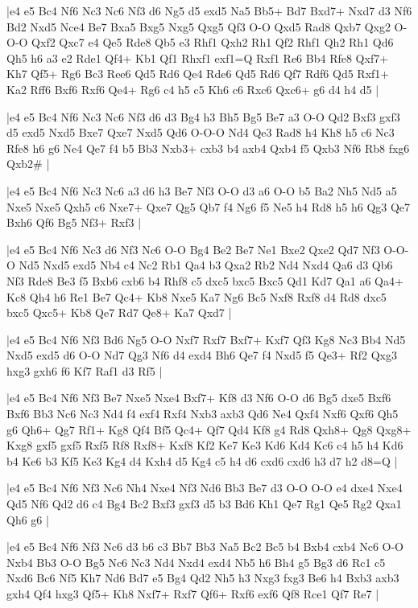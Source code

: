 \whitename{}
\blackname{}
\makegametitle
|e4 e5 Bc4 Nf6 Nc3 Nc6 Nf3 d6 Ng5 d5 exd5 Na5 Bb5+ Bd7 Bxd7+ Nxd7 d3 Nf6 Bd2 Nxd5 Nce4 Be7 Bxa5 Bxg5 Nxg5 Qxg5 Qf3 O-O Qxd5 Rad8 Qxb7 Qxg2 O-O-O Qxf2 Qxc7 e4 Qe5 Rde8 Qb5 e3 Rhf1 Qxh2 Rh1 Qf2 Rhf1 Qh2 Rh1 Qd6 Qh5 h6 a3 e2 Rde1 Qf4+ Kb1 Qf1 Rhxf1 exf1=Q Rxf1 Re6 Bb4 Rfe8 Qxf7+ Kh7 Qf5+ Rg6 Bc3 Ree6 Qd5 Rd6 Qe4 Rde6 Qd5 Rd6 Qf7 Rdf6 Qd5 Rxf1+ Ka2 Rff6 Bxf6 Rxf6 Qe4+ Rg6 c4 h5 c5 Kh6 c6 Rxc6 Qxc6+ g6 d4 h4 d5  |

\whitename{}
\blackname{}
\makegametitle
|e4 e5 Bc4 Nf6 Nc3 Nc6 Nf3 d6 d3 Bg4 h3 Bh5 Bg5 Be7 a3 O-O Qd2 Bxf3 gxf3 d5 exd5 Nxd5 Bxe7 Qxe7 Nxd5 Qd6 O-O-O Nd4 Qe3 Rad8 h4 Kh8 h5 c6 Nc3 Rfe8 h6 g6 Ne4 Qe7 f4 b5 Bb3 Nxb3+ cxb3 b4 axb4 Qxb4 f5 Qxb3 Nf6 Rb8 fxg6 Qxb2\#  |

\whitename{}
\blackname{}
\makegametitle
|e4 e5 Bc4 Nf6 Nc3 Nc6 a3 d6 h3 Be7 Nf3 O-O d3 a6 O-O b5 Ba2 Nh5 Nd5 a5 Nxe5 Nxe5 Qxh5 c6 Nxe7+ Qxe7 Qg5 Qb7 f4 Ng6 f5 Ne5 h4 Rd8 h5 h6 Qg3 Qe7 Bxh6 Qf6 Bg5 Nf3+ Rxf3  |

\whitename{}
\blackname{}
\makegametitle
|e4 e5 Bc4 Nf6 Nc3 d6 Nf3 Nc6 O-O Bg4 Be2 Be7 Ne1 Bxe2 Qxe2 Qd7 Nf3 O-O-O Nd5 Nxd5 exd5 Nb4 c4 Nc2 Rb1 Qa4 b3 Qxa2 Rb2 Nd4 Nxd4 Qa6 d3 Qb6 Nf3 Rde8 Be3 f5 Bxb6 cxb6 b4 Rhf8 c5 dxc5 bxc5 Bxc5 Qd1 Kd7 Qa1 a6 Qa4+ Kc8 Qh4 h6 Re1 Be7 Qc4+ Kb8 Nxe5 Ka7 Ng6 Bc5 Nxf8 Rxf8 d4 Rd8 dxc5 bxc5 Qxc5+ Kb8 Qe7 Rd7 Qe8+ Ka7 Qxd7  |

\whitename{}
\blackname{}
\makegametitle
|e4 e5 Bc4 Nf6 Nf3 Bd6 Ng5 O-O Nxf7 Rxf7 Bxf7+ Kxf7 Qf3 Kg8 Nc3 Bb4 Nd5 Nxd5 exd5 d6 O-O Nd7 Qg3 Nf6 d4 exd4 Bh6 Qe7 f4 Nxd5 f5 Qe3+ Rf2 Qxg3 hxg3 gxh6 f6 Kf7 Raf1 d3 Rf5  |

\whitename{}
\blackname{}
\makegametitle
|e4 e5 Bc4 Nf6 Nf3 Be7 Nxe5 Nxe4 Bxf7+ Kf8 d3 Nf6 O-O d6 Bg5 dxe5 Bxf6 Bxf6 Bb3 Nc6 Nc3 Nd4 f4 exf4 Rxf4 Nxb3 axb3 Qd6 Ne4 Qxf4 Nxf6 Qxf6 Qh5 g6 Qh6+ Qg7 Rf1+ Kg8 Qf4 Bf5 Qc4+ Qf7 Qd4 Kf8 g4 Rd8 Qxh8+ Qg8 Qxg8+ Kxg8 gxf5 gxf5 Rxf5 Rf8 Rxf8+ Kxf8 Kf2 Ke7 Ke3 Kd6 Kd4 Kc6 c4 h5 h4 Kd6 b4 Ke6 b3 Kf5 Ke3 Kg4 d4 Kxh4 d5 Kg4 c5 h4 d6 cxd6 cxd6 h3 d7 h2 d8=Q  |

\whitename{}
\blackname{}
\makegametitle
|e4 e5 Bc4 Nf6 Nf3 Nc6 Nh4 Nxe4 Nf3 Nd6 Bb3 Be7 d3 O-O O-O e4 dxe4 Nxe4 Qd5 Nf6 Qd2 d6 c4 Bg4 Bc2 Bxf3 gxf3 d5 b3 Bd6 Kh1 Qe7 Rg1 Qe5 Rg2 Qxa1 Qh6 g6  |

\whitename{}
\blackname{}
\makegametitle
|e4 e5 Bc4 Nf6 Nf3 Nc6 d3 b6 c3 Bb7 Bb3 Na5 Bc2 Bc5 b4 Bxb4 cxb4 Nc6 O-O Nxb4 Bb3 O-O Bg5 Nc6 Nc3 Nd4 Nxd4 exd4 Nb5 h6 Bh4 g5 Bg3 d6 Rc1 c5 Nxd6 Bc6 Nf5 Kh7 Nd6 Bd7 e5 Bg4 Qd2 Nh5 h3 Nxg3 fxg3 Be6 h4 Bxb3 axb3 gxh4 Qf4 hxg3 Qf5+ Kh8 Nxf7+ Rxf7 Qf6+ Rxf6 exf6 Qf8 Rce1 Qf7 Re7  |

